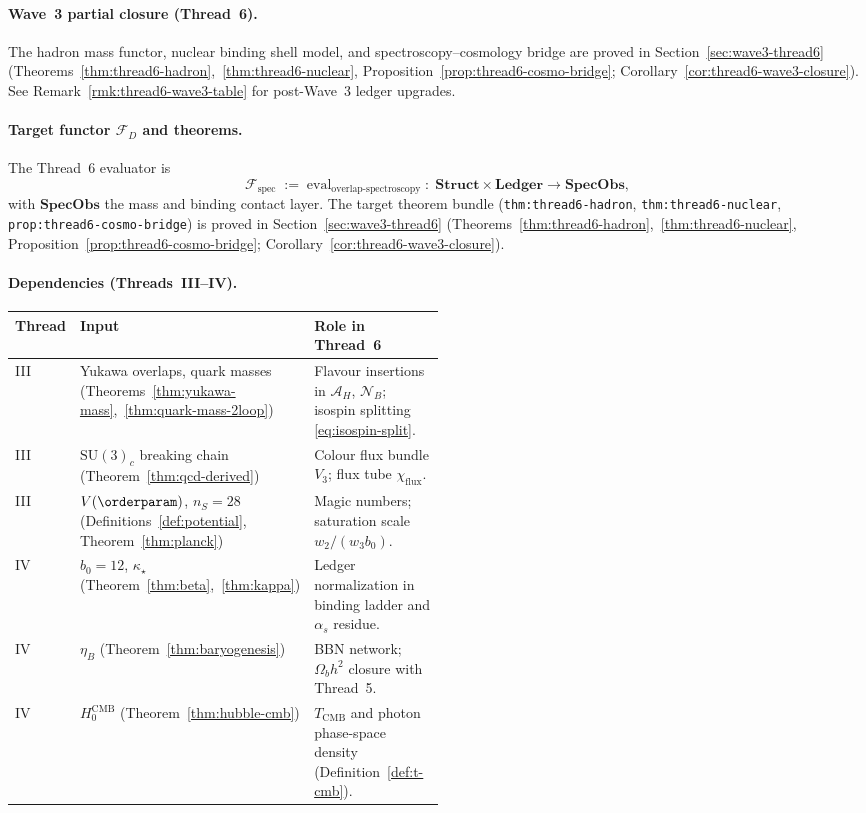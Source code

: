 \paragraph{Wave~3 partial closure (Thread~6).}
The hadron mass functor, nuclear binding shell model, and
spectroscopy--cosmology bridge are proved in Section~\ref{sec:wave3-thread6}
(Theorems~\ref{thm:thread6-hadron},~\ref{thm:thread6-nuclear},
Proposition~\ref{prop:thread6-cosmo-bridge};
Corollary~\ref{cor:thread6-wave3-closure}).
See Remark~\ref{rmk:thread6-wave3-table} for post-Wave~3 ledger upgrades.

\paragraph{Target functor $\mathcal{F}_D$ and theorems.}
The Thread~6 evaluator is
\begin{equation}\label{eq:FD-spec}
  \mathcal{F}_{\mathrm{spec}}
  \;:=\;
  \mathrm{eval}_{\mathrm{overlap\text{-}spectroscopy}}
  \;:\;
  \mathbf{Struct}\times\mathbf{Ledger}
  \longrightarrow
  \mathbf{SpecObs},
\end{equation}
with $\mathbf{SpecObs}$ the mass and binding contact layer. The target theorem
bundle
(\texttt{thm:thread6-hadron}, \texttt{thm:thread6-nuclear},
\texttt{prop:thread6-cosmo-bridge}) is proved in Section~\ref{sec:wave3-thread6}
(Theorems~\ref{thm:thread6-hadron},~\ref{thm:thread6-nuclear},
Proposition~\ref{prop:thread6-cosmo-bridge};
Corollary~\ref{cor:thread6-wave3-closure}).

\paragraph{Dependencies (Threads~III--IV).}
\begin{center}
\small
\renewcommand{\arraystretch}{1.10}
\begin{tabular}{@{}llp{0.50\linewidth}@{}}
\toprule
\textbf{Thread} & \textbf{Input} & \textbf{Role in Thread~6} \\
\midrule
III &
  Yukawa overlaps, quark masses
  (Theorems~\ref{thm:yukawa-mass},~\ref{thm:quark-mass-2loop}) &
  Flavour insertions in $\mathcal{A}_H$, $\mathcal{N}_B$;
  isospin splitting \eqref{eq:isospin-split}. \\
III &
  $\mathrm{SU}(3)_c$ breaking chain
  (Theorem~\ref{thm:qcd-derived}) &
  Colour flux bundle $V_3$; flux tube $\chi_{\mathrm{flux}}$. \\
III &
  $V(\orderparam)$, $n_S=28$
  (Definitions~\ref{def:potential}, Theorem~\ref{thm:planck}) &
  Magic numbers; saturation scale $w_2/(w_3 b_0)$. \\
IV &
  $b_0=12$, $\kappa_\star$ (Theorem~\ref{thm:beta},~\ref{thm:kappa}) &
  Ledger normalization in binding ladder and $\alpha_s$ residue. \\
IV &
  $\eta_B$ (Theorem~\ref{thm:baryogenesis}) &
  BBN network; $\Omega_b h^2$ closure with Thread~5. \\
IV &
  $H_0^{\mathrm{CMB}}$ (Theorem~\ref{thm:hubble-cmb}) &
  $T_{\mathrm{CMB}}$ and photon phase-space density
  (Definition~\ref{def:t-cmb}). \\
\bottomrule
\end{tabular}
\end{center}

